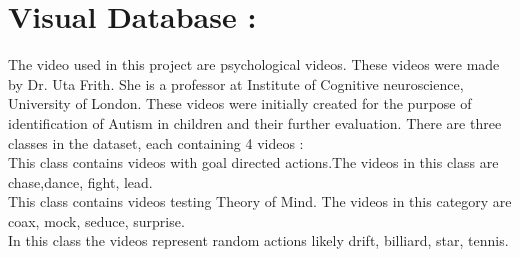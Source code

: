 \def\DevnagVersion{2.15}\documentclass[a4paper, 11pt, notitlepage]{report}
\begin{document}
\section{ Visual Database :} The video used in this project are psychological videos. These videos were made by Dr. Uta Frith. She is a professor at Institute of Cognitive neuroscience, University of London. These videos were initially created for the purpose of identification of Autism in children and their further evaluation. There are three classes in the dataset, each containing 4 videos : \\
\hspace*{10pt}{\bf 1- GD :} This class contains videos with goal directed actions.The videos in this class are chase,dance, fight, lead.\\ 
\hspace*{10pt}{\bf 2- TOM :} This class contains videos testing Theory of Mind. The videos in this category are coax, mock, seduce, surprise.\\
\hspace*{10pt}{\bf 3- Random :} In this class the videos represent random actions likely drift, billiard, star, tennis.
\end{document}

